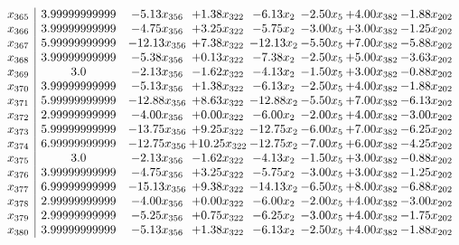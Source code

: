 \documentclass[8pt]{article}
\begin{document}
\[\begin{array}{c| c c@{\hskip 2pt} c@{\hskip 2pt} c@{\hskip 2pt} c@{\hskip 2pt} c@{\hskip 2pt} c@{\hskip 2pt} }
 x_{365}   &  3.99999999999 & -5.13 x_{356} & +  1.38 x_{322} & -6.13 x_{2} & -2.50 x_{5} & +  4.00 x_{382} & -1.88 x_{202}\\
 x_{366}   &  3.99999999999 & -4.75 x_{356} & +  3.25 x_{322} & -5.75 x_{2} & -3.00 x_{5} & +  3.00 x_{382} & -1.25 x_{202}\\
 x_{367}   &  5.99999999999 & -12.13 x_{356} & +  7.38 x_{322} & -12.13 x_{2} & -5.50 x_{5} & +  7.00 x_{382} & -5.88 x_{202}\\
 x_{368}   &  3.99999999999 & -5.38 x_{356} & +  0.13 x_{322} & -7.38 x_{2} & -2.50 x_{5} & +  5.00 x_{382} & -3.63 x_{202}\\
 x_{369}   &  3.0 & -2.13 x_{356} & -1.62 x_{322} & -4.13 x_{2} & -1.50 x_{5} & +  3.00 x_{382} & -0.88 x_{202}\\
 x_{370}   &  3.99999999999 & -5.13 x_{356} & +  1.38 x_{322} & -6.13 x_{2} & -2.50 x_{5} & +  4.00 x_{382} & -1.88 x_{202}\\
 x_{371}   &  5.99999999999 & -12.88 x_{356} & +  8.63 x_{322} & -12.88 x_{2} & -5.50 x_{5} & +  7.00 x_{382} & -6.13 x_{202}\\
 x_{372}   &  2.99999999999 & -4.00 x_{356} & +  0.00 x_{322} & -6.00 x_{2} & -2.00 x_{5} & +  4.00 x_{382} & -3.00 x_{202}\\
 x_{373}   &  5.99999999999 & -13.75 x_{356} & +  9.25 x_{322} & -12.75 x_{2} & -6.00 x_{5} & +  7.00 x_{382} & -6.25 x_{202}\\
 x_{374}   &  6.99999999999 & -12.75 x_{356} & + 10.25 x_{322} & -12.75 x_{2} & -7.00 x_{5} & +  6.00 x_{382} & -4.25 x_{202}\\
 x_{375}   &  3.0 & -2.13 x_{356} & -1.62 x_{322} & -4.13 x_{2} & -1.50 x_{5} & +  3.00 x_{382} & -0.88 x_{202}\\
 x_{376}   &  3.99999999999 & -4.75 x_{356} & +  3.25 x_{322} & -5.75 x_{2} & -3.00 x_{5} & +  3.00 x_{382} & -1.25 x_{202}\\
 x_{377}   &  6.99999999999 & -15.13 x_{356} & +  9.38 x_{322} & -14.13 x_{2} & -6.50 x_{5} & +  8.00 x_{382} & -6.88 x_{202}\\
 x_{378}   &  2.99999999999 & -4.00 x_{356} & +  0.00 x_{322} & -6.00 x_{2} & -2.00 x_{5} & +  4.00 x_{382} & -3.00 x_{202}\\
 x_{379}   &  2.99999999999 & -5.25 x_{356} & +  0.75 x_{322} & -6.25 x_{2} & -3.00 x_{5} & +  4.00 x_{382} & -1.75 x_{202}\\
 x_{380}   &  3.99999999999 & -5.13 x_{356} & +  1.38 x_{322} & -6.13 x_{2} & -2.50 x_{5} & +  4.00 x_{382} & -1.88 x_{202}\\

\end{array}\]
\end{document}
